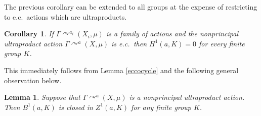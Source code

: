 \documentclass[12pt]{amsart}
\newtheorem{lem}[thm]{Lemma}
\newtheorem{cor}[thm]{Corollary}
\theoremstyle{definition}
\newcommand{\acts}{\curvearrowright}
\begin{document}
The previous corollary can be extended to all groups at the expense of restricting to e.c.\ actions which are ultraproducts.

\begin{cor}
	If $\Gamma\acts^{a_i}(X_i,\mu)$ is a family of actions and the nonprincipal ultraproduct action $\Gamma\acts^a (X,\mu)$ is e.c.\, then $H^1(a,K)=0$ for every finite group $K$.
\end{cor}

This immediately follows from Lemma \ref{eccocycle} and the following general observation below.

\begin{lem}\label{ultraclosed}
	Suppose that $\Gamma \acts^a(X,\mu)$ is a nonprincipal ultraproduct action.  Then $B^1(a,K)$ is closed in $Z^1(a,K)$ for any finite group $K$.
\end{lem}
\end{document}
